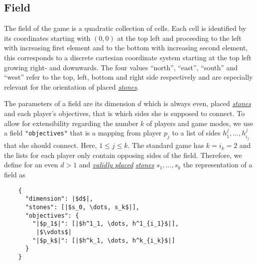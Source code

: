 \documentclass{scrartcl}
\begin{document}
\subsection{Field}
\hypertarget{field}{}
The field of the game is a quadratic collection of cells. Each cell is 
identified by its coordinates starting with $(0,0)$ at the top left and 
proceeding to the left with increasing first element and to the bottom with 
increasing second element, this corresponds to a discrete cartesian coordinate 
system starting at the top left growing right- and downwards. The four values 
\enquote{north}, \enquote{east}, \enquote{south} and \enquote{west} refer to 
the top, left, bottom and right side respectively and are especially relevant 
for the orientation of placed \hyperlink{stone}{\emph{stones}}.

\begin{mdframed}[frametitle = {Representation and Illustration}]
  The parameters of a field are its dimension $d$ which is always even, placed 
  \hyperlink{stone}{\emph{stones}} and each player's objectives, that is which
  sides she is supposed to connect. To allow for extensibility regarding the
  number $k$ of players and game modes, we use a field
  \texttt{"objectives"} that is a mapping from player $p_j$ to
  a list of sides $h^j_1, \dots, h^j_{i_j}$ that she should connect.
  Here, $1 \leq j \leq k$. The standard game has $k = i_k = 2$ and the
  lists for each player only contain opposing sides of the field.
  Therefore, we define for an even $d > 1$ and
  \hyperlink{valid}{\emph{validly placed}} \hyperlink{stone}{\emph{stones}}
  $s_{1}, \dots, s_{k}$ the representation of a field as
  \begin{verbatim}
    {
      "dimension": |$d$|,
      "stones": [|$s_0, \dots, s_k$|],
      "objectives": {
        "|$p_1$|": [|$h^1_1, \dots, h^1_{i_1}$|],
         |$\vdots$|
        "|$p_k$|": [|$h^k_1, \dots, h^k_{i_k}$|]
      }
    }
  \end{verbatim}
  \begin{center}
\end{center}
\end{mdframed}
\end{document}
